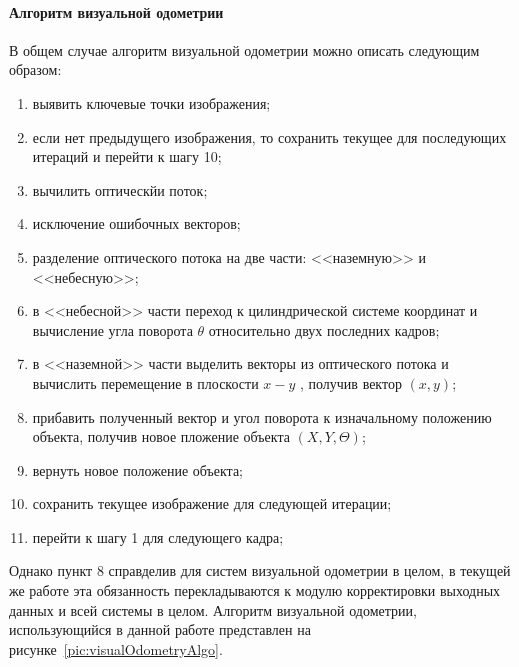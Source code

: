 \paragraph{Алгоритм визуальной одометрии}
В общем случае алгоритм визуальной одометрии можно описать следующим образом:
\begin{enumerate}
\item выявить ключевые точки изображения;
\item если нет предыдущего изображения, то сохранить текущее для последующих итераций и перейти к шагу 10;
\item вычилить оптическйи поток;
\item исключение ошибочных векторов;
\item разделение оптического потока на две части: <<наземную>> и <<небесную>>;
\item в <<небесной>> части переход к цилиндрической системе координат и вычисление угла поворота $\theta$ относительно двух последних кадров;
\item в <<наземной>> части выделить векторы  из оптического потока  и вычислить перемещение в плоскости  $x-y$ , получив вектор $(x, y)$;
\item прибавить полученный вектор и угол поворота к изначальному положению объекта, получив новое пложение объекта $(X, Y, \Theta)$;
\item вернуть новое положение объекта;
\item сохранить текущее изображение для следующей итерации;
\item перейти к шагу 1 для следующего кадра;
\end{enumerate}
	
Однако пункт 8 справделив для систем визуальной одометрии в целом, в текущей же работе эта обязанность перекладываются к модулю корректировки выходных данных и всей системы в целом. Алгоритм визуальной одометрии, использующийся в данной работе представлен на рисунке~\ref{pic:visualOdometryAlgo}.

